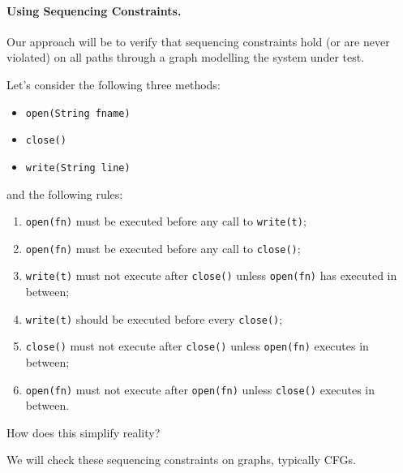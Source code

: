 \documentclass[11pt]{article}
\begin{document}
\paragraph{Using Sequencing Constraints.} Our approach will be to 
verify that sequencing constraints hold (or are never violated) on all
paths through a graph modelling the system under test.

\newpage
Let's consider the following three methods: 
\begin{itemize}
\item {\tt open(String fname)}
\item {\tt close()}
\item {\tt write(String line)}
\end{itemize}
and the following rules:
\begin{enumerate}
\item {\tt open(fn)} must be executed before any call to {\tt write(t)};
\item {\tt open(fn)} must be executed before any call to {\tt close()};
\item {\tt write(t)} must not execute after {\tt close()} unless {\tt open(fn)} has executed in between;
\item {\tt write(t)} should be executed before every {\tt close()};
\item {\tt close()} must not execute after {\tt close()} unless {\tt open(fn)} executes in between;
\item {\tt open(fn)} must not execute after {\tt open(fn)} unless {\tt close()} executes in between.
\end{enumerate}

{\sf How does this simplify reality?}

We will check these sequencing constraints on graphs, typically CFGs.
\end{document}
